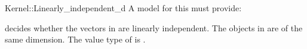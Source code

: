 \begin{ccRefFunctionObjectConcept}{Kernel::Linearly_independent_d}
A model for this must provide:


 {decides
  whether the vectors in \ccc{A = tuple [first,last)} are linearly
  independent.  \ccPrecond The objects in  are of the same
  dimension.  \ccRequire The value type of  is
  .}

\end{ccRefFunctionObjectConcept}
